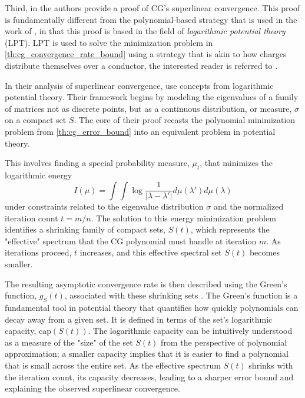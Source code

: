 Third, in \cite{cg_superlinear_Beckermann2001} the authors provide a proof of CG's superlinear convergence. This proof is fundamentally different from the polynomial-based strategy that is used in the work of \cite{cg_sharpened_convrate_Axelsson1976}, in that this proof is based in the field of \textit{logarithmic potential theory} (LPT). LPT is used to solve the minimization problem in \cref{th:cg_convergence_rate_bound} using a strategy that is akin to how charges distribute themselves over a conductor, the interested reader is referred to \cite{from_potential_theory_to_matrix_iterations_in_six_steps_Driscoll1998}.

In their analysis of superlinear convergence, \citeauthor{cg_superlinear_Beckermann2001} use concepts from logarithmic potential theory. Their framework begins by modeling the eigenvalues of a family of matrices not as discrete points, but as a continuous distribution, or measure, $\sigma$ on a compact set $S$. The core of their proof recasts the polynomial minimization problem from \cref{th:cg_error_bound} into an equivalent problem in potential theory.

This involves finding a special probability measure, $\mu_t$, that minimizes the logarithmic energy
\[
    I(\mu) = \int \int \log \frac{1}{|\lambda-\lambda'|} d\mu(\lambda') d\mu(\lambda)
\]
under constraints related to the eigenvalue distribution $\sigma$ and the normalized iteration count $t = m/n$. The solution to this energy minimization problem identifies a shrinking family of compact sets, $S(t)$, which represents the "effective" spectrum that the CG polynomial must handle at iteration $m$. As iterations proceed, $t$ increases, and this effective spectral set $S(t)$ becomes smaller.

The resulting asymptotic convergence rate is then described using the Green's function, $g_S(t)$, associated with these shrinking sets \cite[Equations 2.22-2.31]{cg_superlinear_Beckermann2001}. The Green's function is a fundamental tool in potential theory that quantifies how quickly polynomials can decay away from a given set. It is defined in terms of the set's logarithmic capacity, $\text{cap}(S(t))$. The logarithmic capacity can be intuitively understood as a measure of the "size" of the set $S(t)$ from the perspective of polynomial approximation; a smaller capacity implies that it is easier to find a polynomial that is small across the entire set. As the effective spectrum $S(t)$ shrinks with the iteration count, its capacity decreases, leading to a sharper error bound and explaining the observed superlinear convergence.

